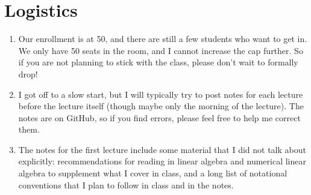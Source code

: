 \section{Logistics}

\begin{enumerate}
\item
  Our enrollment is at 50, and there are still a few students who want
  to get in.  We only have 50 seats in the room, and I cannot increase
  the cap further.  So if you are not planning to stick with the class,
  please don't wait to formally drop!

\item
  I got off to a slow start, but I will typically try to post notes for
  each lecture before the lecture itself (though maybe only the morning
  of the lecture).  The notes are on GitHub, so if you find errors,
  please feel free to help me correct them.

\item
  The notes for the first lecture include some material that I did not
  talk about explicitly: recommendations for reading in linear algebra
  and numerical linear algebra to supplement what I cover in class,
  and a long list of notational conventions that I plan to follow in class
  and in the notes.

\end{enumerate}
